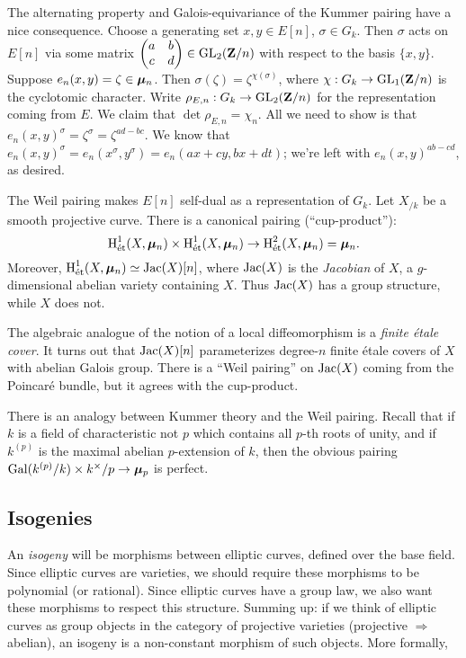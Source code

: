 The alternating property and Galois-equivariance of the Kummer pairing have a 
nice consequence. Choose a generating set $x,y\in E[n]$, $\sigma\in G_k$. Then 
$\sigma$ acts on $E[n]$ via some matrix 
$\begin{pmatrix} a & b \\ c & d \end{pmatrix}\in \operatorname{GL}_2(\mathbf{Z}/n)$ 
with respect to the basis $\{x,y\}$. Suppose $e_n(x,y)=\zeta\in {\bm\mu}_n$. Then 
$\sigma(\zeta) = \zeta^{\chi(\sigma)}$, where $\chi:G_k\to \operatorname{GL}_1(\mathbf{Z}/n)$ is 
the cyclotomic character. Write $\rho_{E,n}:G_k\to \operatorname{GL}_2(\mathbf{Z}/n)$ for the 
representation coming from $E$. We claim that $\det\rho_{E,n} = \chi_n$. All 
we need to show is that $e_n(x,y)^\sigma = \zeta^\sigma = \zeta^{a d-b c}$. We 
know that $e_n(x,y)^\sigma = e_n(x^\sigma,y^\sigma) = e_n(a x+c y, b x+d t)$; 
we're left with $e_n(x,y)^{a b-c d}$, as desired. 

The Weil pairing makes $E[n]$ self-dual as a representation of $G_k$. 
Let $X_{/k}$ be a smooth projective curve. There is a canonical pairing 
(``cup-product''): 
\[
  \operatorname{H}_{\textnormal{\'et}}^1(X,{\bm\mu}_n)\times \operatorname{H}_{\textnormal{\'et}}^1(X,{\bm\mu}_n) \to \operatorname{H}_{\textnormal{\'et}}^2(X,{\bm\mu}_n) = {\bm\mu}_n .
\]
Moreover, $\operatorname{H}_{\textnormal{\'et}}^1(X,{\bm\mu}_n) \simeq \operatorname{Jac}(X)[n]$, where $\operatorname{Jac}(X)$ 
is the \emph{Jacobian} of $X$, a $g$-dimensional abelian variety containing 
$X$. Thus $\operatorname{Jac}(X)$ has a group structure, while $X$ does not. 

The algebraic analogue of the notion of a local diffeomorphism is a 
\emph{finite \'etale cover}. It turns out that $\operatorname{Jac}(X)[n]$ parameterizes 
degree-$n$ finite \'etale covers of $X$ with abelian Galois group. There is a 
``Weil pairing'' on $\operatorname{Jac}(X)$ coming from the Poincar\'e bundle, but it 
agrees with the cup-product. 

There is an analogy between Kummer theory and the Weil pairing. Recall that if 
$k$ is a field of characteristic not $p$ which contains all $p$-th roots of 
unity, and if $k^{(p)}$ is the maximal abelian $p$-extension of $k$, then the 
obvious pairing $\operatorname{Gal}(k^{(p)}/k)\times k^\times/p \to {\bm\mu}_p$ is perfect. 





\subsection{Isogenies}

An \emph{isogeny} will be morphisms between elliptic curves, defined over the 
base field. Since elliptic curves are varieties, we should require these 
morphisms to be polynomial (or rational). Since elliptic curves have a group 
law, we also want these morphisms to respect this structure. Summing up: if we 
think of elliptic curves as group objects in the category of projective 
varieties (projective $\Rightarrow$ abelian), an isogeny is a non-constant 
morphism of such objects. More formally, 

